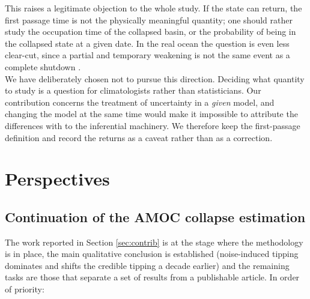 \documentclass[12pt,a4paper]{article}
\theoremstyle{definition}
\theoremstyle{plain}
\begin{document}
\noindent This raises a legitimate objection to the whole study. If the state can return, the first
passage time is not the physically meaningful quantity; one should rather study the occupation
time of the collapsed basin, or the probability of being in the collapsed state at a given
date. In the real ocean the question is even less clear-cut, since a partial and temporary
weakening is not the same event as a complete shutdown \cite{rahmstorf2005}. \\

\noindent We have deliberately chosen not to pursue this direction. Deciding what quantity to study is a question for climatologists rather than statisticians. Our contribution concerns the treatment of uncertainty in a \emph{given}
model, and changing the model at the same time would make it impossible to attribute the
differences with \cite{ditlevsen2023} to the inferential machinery. We therefore keep the
first-passage definition and record the returns as a caveat rather than as a correction. \\



\bigskip


\section{Perspectives}
\label{sec:perspectives}

\subsection{Continuation of the AMOC collapse estimation}
\label{sec:amoc-continuation}

The work reported in Section \ref{sec:contrib} is at the stage where the methodology is in
place, the main qualitative conclusion is established (noise-induced tipping dominates and
shifts the credible tipping a decade earlier) and the remaining tasks are those that
separate a set of results from a publishable article. In order of priority:
\end{document}
